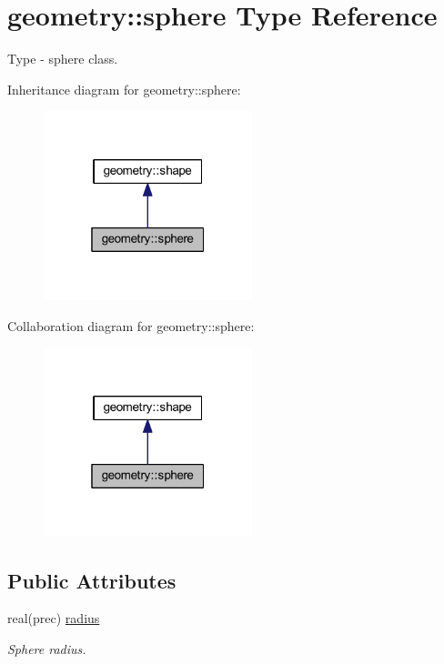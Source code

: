 \hypertarget{structgeometry_1_1sphere}{}\section{geometry\+:\+:sphere Type Reference}
\label{structgeometry_1_1sphere}


Type -\/ sphere class.  




Inheritance diagram for geometry\+:\+:sphere\+:\nopagebreak
\begin{figure}[H]
\begin{center}
\leavevmode
\includegraphics[width=172pt]{structgeometry_1_1sphere__inherit__graph}
\end{center}
\end{figure}


Collaboration diagram for geometry\+:\+:sphere\+:\nopagebreak
\begin{figure}[H]
\begin{center}
\leavevmode
\includegraphics[width=172pt]{structgeometry_1_1sphere__coll__graph}
\end{center}
\end{figure}
\subsection*{Public Attributes}
\begin{DoxyCompactItemize}
\item 
real(prec) \mbox{\hyperlink{structgeometry_1_1sphere_a906fbbdb8c6b56e7d45cea4e96b6e04d}{radius}}
\begin{DoxyCompactList}\small\item\em Sphere radius. \end{DoxyCompactList}\end{DoxyCompactItemize}


